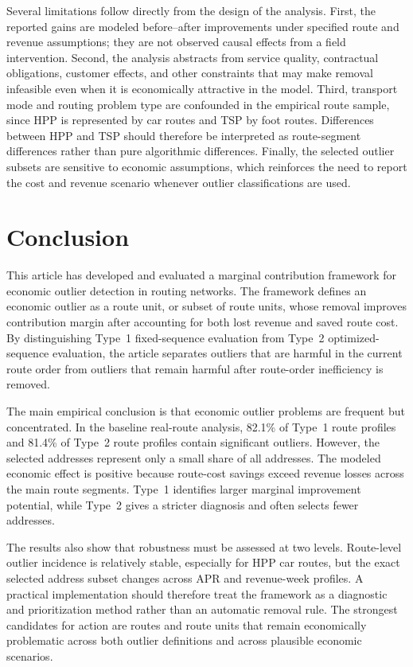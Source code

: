 \documentclass[preprint,12pt]{elsarticle}
\begin{document}
Several limitations follow directly from the design of the analysis. First, the reported gains are modeled before--after improvements under specified route and revenue assumptions; they are not observed causal effects from a field intervention. Second, the analysis abstracts from service quality, contractual obligations, customer effects, and other constraints that may make removal infeasible even when it is economically attractive in the model. Third, transport mode and routing problem type are confounded in the empirical route sample, since HPP is represented by car routes and TSP by foot routes. Differences between HPP and TSP should therefore be interpreted as route-segment differences rather than pure algorithmic differences. Finally, the selected outlier subsets are sensitive to economic assumptions, which reinforces the need to report the cost and revenue scenario whenever outlier classifications are used.

\section{Conclusion}
\label{sec:conclusion}

This article has developed and evaluated a marginal contribution framework for economic outlier detection in routing networks. The framework defines an economic outlier as a route unit, or subset of route units, whose removal improves contribution margin after accounting for both lost revenue and saved route cost. By distinguishing Type~1 fixed-sequence evaluation from Type~2 optimized-sequence evaluation, the article separates outliers that are harmful in the current route order from outliers that remain harmful after route-order inefficiency is removed.

The main empirical conclusion is that economic outlier problems are frequent but concentrated. In the baseline real-route analysis, 82.1\% of Type~1 route profiles and 81.4\% of Type~2 route profiles contain significant outliers. However, the selected addresses represent only a small share of all addresses. The modeled economic effect is positive because route-cost savings exceed revenue losses across the main route segments. Type~1 identifies larger marginal improvement potential, while Type~2 gives a stricter diagnosis and often selects fewer addresses.

The results also show that robustness must be assessed at two levels. Route-level outlier incidence is relatively stable, especially for HPP car routes, but the exact selected address subset changes across APR and revenue-week profiles. A practical implementation should therefore treat the framework as a diagnostic and prioritization method rather than an automatic removal rule. The strongest candidates for action are routes and route units that remain economically problematic across both outlier definitions and across plausible economic scenarios.
\end{document}
